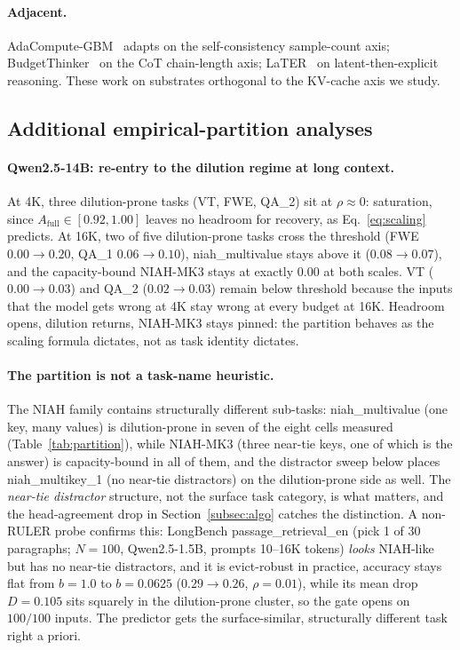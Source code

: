 \documentclass{article}
\begin{document}
\paragraph{Adjacent.}
AdaCompute-GBM~\citep{arxiv260414853} adapts on the self-consistency sample-count
axis; BudgetThinker~\citep{arxiv250817196} on the CoT chain-length axis;
LaTER~\citep{arxiv260507315} on latent-then-explicit reasoning. These work on
substrates orthogonal to the KV-cache axis we study.

\subsection{Additional empirical-partition analyses}

\paragraph{Qwen2.5-14B: re-entry to the dilution regime at long
context.} At 4K, three dilution-prone tasks (VT, FWE, QA\_2) sit at
$\rho \approx 0$: saturation, since $A_{\mathrm{full}} \in [0.92,
1.00]$ leaves no headroom for recovery, as Eq.~\eqref{eq:scaling}
predicts. At 16K, two of five dilution-prone tasks cross the
threshold (FWE $0.00 \to 0.20$, QA\_1 $0.06 \to 0.10$),
niah\_multivalue stays above it ($0.08 \to 0.07$), and the capacity-bound
NIAH-MK3 stays at exactly $0.00$ at both scales. VT ($0.00 \to 0.03$) and QA\_2
($0.02 \to 0.03$) remain below threshold because the inputs that the
model gets wrong at 4K stay wrong at every budget at 16K. Headroom
opens, dilution returns, NIAH-MK3 stays pinned: the partition behaves
as the scaling formula dictates, not as task identity dictates.

\paragraph{The partition is not a task-name heuristic.} The NIAH family contains
structurally different sub-tasks: niah\_multivalue (one key, many values) is
dilution-prone in seven of the eight cells measured (Table~\ref{tab:partition}), while
NIAH-MK3 (three near-tie keys, one of which is the answer) is capacity-bound in
all of them, and the distractor sweep below places niah\_multikey\_1 (no
near-tie distractors) on the dilution-prone side as well. The
\emph{near-tie distractor} structure, not the surface task category, is what
matters, and the head-agreement drop in Section~\ref{subsec:algo} catches the
distinction. A non-RULER probe confirms this: LongBench
passage\_retrieval\_en (pick 1 of 30 paragraphs; $N = 100$,
Qwen2.5-1.5B, prompts 10--16K tokens) \emph{looks} NIAH-like but has no
near-tie distractors, and it is evict-robust in practice, accuracy
stays flat from $b = 1.0$ to $b = 0.0625$ ($0.29 \to 0.26$, $\rho =
0.01$), while its mean drop $D = 0.105$ sits squarely in the
dilution-prone cluster, so the gate opens on $100/100$ inputs. The
predictor gets the surface-similar, structurally different task right
a priori.
\end{document}
